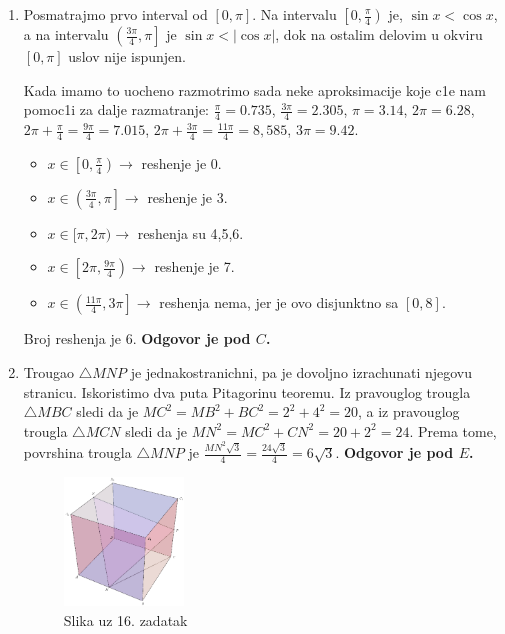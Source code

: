 \documentclass[a4paper,12pt]{article}
\begin{document}
\begin{enumerate}[1.]
\item Posmatrajmo prvo interval od $[0,\pi]$. Na intervalu $\left[0, \frac{\pi}{4}\right)$ je, $\sin x < \cos x$, a na intervalu $\left(\frac{3\pi}{4}, \pi\right]$ je $\sin x < |\cos x|$, dok na ostalim delovim u okviru $[0,\pi]$ uslov nije ispunjen.
\par Kada imamo to uocheno razmotrimo sada neke aproksimacije koje c1e nam pomoc1i za dalje razmatranje: $\frac{\pi}{4} = 0.735
$, $\frac{3\pi}{4} = 2.305$, $\pi = 3.14$, $2\pi = 6.28$, $2\pi + \frac{\pi}{4} =\frac{9\pi}{4} = 7.015$, $2\pi + \frac{3\pi}{4} =\frac{11\pi}{4} = 8,585$, $3\pi = 9.42$.
\begin{itemize}
\item $x \in \left[0,\frac{\pi}{4}\right)\rightarrow $ reshenje je 0.
\item $x \in \left(\frac{3\pi}{4}, \pi\right] \rightarrow $ reshenje je 3.
\item $x \in [\pi, 2\pi) \rightarrow $ reshenja su 4,5,6.
\item $x \in \left[2\pi, \frac{9\pi}{4}\right) \rightarrow $ reshenje je 7.
\item $x \in \left(\frac{11\pi}{4}, 3\pi\right] \rightarrow $ reshenja nema, jer je ovo disjunktno sa $[0,8]$.
\end{itemize}
\par Broj reshenja je 6. \textbf{Odgovor je pod $C$.} 


\item Trougao $\triangle MNP$ je jednakostranichni, pa je dovoljno izrachunati njegovu stranicu. Iskoristimo dva puta Pitagorinu teoremu. Iz pravouglog trougla $\triangle MBC$ sledi da je $MC^2=MB^2+BC^2=2^2+4^2=20$, a iz pravouglog trougla $\triangle MCN$ sledi da je $MN^2=MC^2+CN^2=20+2^2=24$. Prema tome, povrshina trougla $\triangle MNP$ je $\frac{MN^2\sqrt{3}}{4}=\frac{24\sqrt{3}}{4}=6\sqrt{3}$. \textbf{Odgovor je pod $E$.}


\begin{figure}[h!]
\begin{center}
\includegraphics[width=0.3\textwidth]{sl5.eps}
\caption{Slika uz 16. zadatak}
\end{center}
\end{figure}


\end{enumerate}
\end{document}
